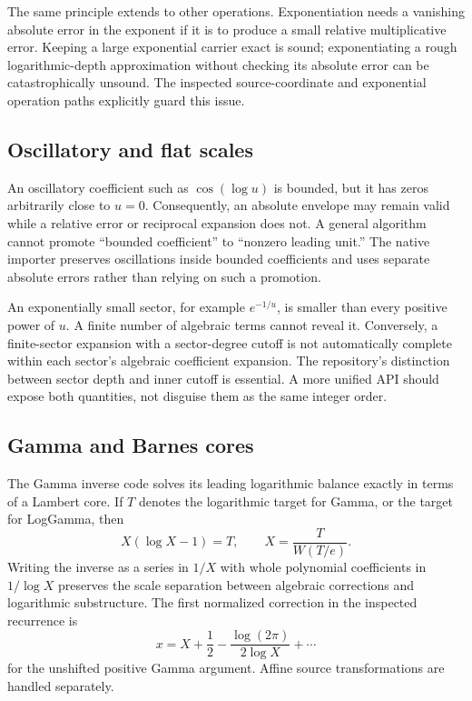 The same principle extends to other operations. Exponentiation needs a vanishing absolute error in the exponent if it is to produce a small relative multiplicative error. Keeping a large exponential carrier exact is sound; exponentiating a rough logarithmic-depth approximation without checking its absolute error can be catastrophically unsound. The inspected source-coordinate and exponential operation paths explicitly guard this issue.\cite{operations,sourcecharts}

\subsection{Oscillatory and flat scales}
An oscillatory coefficient such as $\cos(\log u)$ is bounded, but it has zeros arbitrarily close to $u=0$. Consequently, an absolute envelope may remain valid while a relative error or reciprocal expansion does not. A general algorithm cannot promote ``bounded coefficient'' to ``nonzero leading unit.'' The native importer preserves oscillations inside bounded coefficients and uses separate absolute errors rather than relying on such a promotion.\cite{native}

An exponentially small sector, for example $e^{-1/u}$, is smaller than every positive power of $u$. A finite number of algebraic terms cannot reveal it. Conversely, a finite-sector expansion with a sector-degree cutoff is not automatically complete within each sector's algebraic coefficient expansion. The repository's distinction between sector depth and inner cutoff is essential. A more unified API should expose both quantities, not disguise them as the same integer order.\cite{guide,repoarticle}

\subsection{Gamma and Barnes cores}
The Gamma inverse code solves its leading logarithmic balance exactly in terms of a Lambert core. If $T$ denotes the logarithmic target for Gamma, or the target for LogGamma, then
\[
 X(\log X-1)=T,
 \qquad X=\frac{T}{W(T/e)}.
\]
Writing the inverse as a series in $1/X$ with whole polynomial coefficients in $1/\log X$ preserves the scale separation between algebraic corrections and logarithmic substructure. The first normalized correction in the inspected recurrence is
\[
 x=X+\frac12-\frac{\log(2\pi)}{2\log X}+\cdots
\]
for the unshifted positive Gamma argument. Affine source transformations are handled separately.\cite{gamma,dlmf-gamma}

